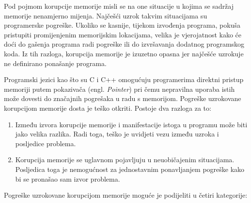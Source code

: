 \documentclass[times, utf8, diplomski, numeric]{fer}
\begin{document}
Pod pojmom korupcije memorije misli se na one situacije u kojima
se sadržaj memorije nenamjerno mijenja. Najčešći uzrok takvim
situacijama su programerske pogreške. Ukoliko se kasnije, tijekom
izvođenja programa, pokuša pristupiti promijenjenim memorijskim
lokacijama, velika je vjerojatnost kako će doći do gašenja
programa radi pogreške ili do izvršavanja dodatnog programskog koda. Iz tih
razloga, korupcija memorije je izuzetno opasna jer najčešće
uzrokuje ne definirano ponašanje programa. 

Programski jezici kao što su C i C++ omogućuju programerima
direktni pristup memoriji putem pokazivača (engl. \emph{Pointer}) 
pri čemu nepravilna uporaba istih može dovesti do značajnih
pogrešaka u radu s memorijom.
Pogreške uzrokovane korupcijom memorije dosta je teško otkriti.
Postoje dva razloga za to:

\begin{enumerate}

\item Između izvora korupcije memorije i manifestacije istoga u		%
programu može biti jako velika razlika. Radi toga, teško je
uvidjeti vezu između uzroka i posljedice problema.

\item Korupcija memorije se uglavnom pojavljuju u neuobičajenim
situacijama. Posljedica toga je nemogućnost za jednostavnim
ponavljanjem pogreške kako bi se pronašao sam izvor problema.

\end{enumerate}

Pogreške uzrokovane korupcijom memorije moguće je podijeliti u
četiri kategorije:
\end{document}
